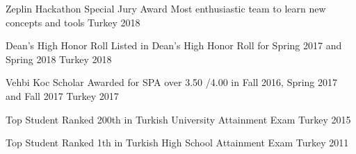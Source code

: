 

\cvsubsection{ }

\begin{cvhonors}
  \cvhonor
    {Zeplin Hackathon Special Jury Award} %
    {Most enthusiastic team to learn new concepts and tools} %
    {Turkey} %
    {2018} %

  \cvhonor
    {Dean’s High Honor Roll } %
    {Listed in Dean's High Honor Roll for Spring 2017 and Spring 2018} %
    {Turkey} %
    {2018} %

  \cvhonor
    {Vehbi Koc Scholar} %
    {Awarded for SPA over 3.50 /4.00 in Fall 2016, Spring 2017 and Fall 2017} %
    {Turkey} %
    {2017} %

  \cvhonor
    {Top Student} %
    {Ranked 200th in Turkish University Attainment Exam} %
    {Turkey} %
    {2015} %

  \cvhonor
    {Top Student} %
    {Ranked 1th in Turkish High School Attainment Exam} %
    {Turkey} %
    {2011} %


\end{cvhonors}



